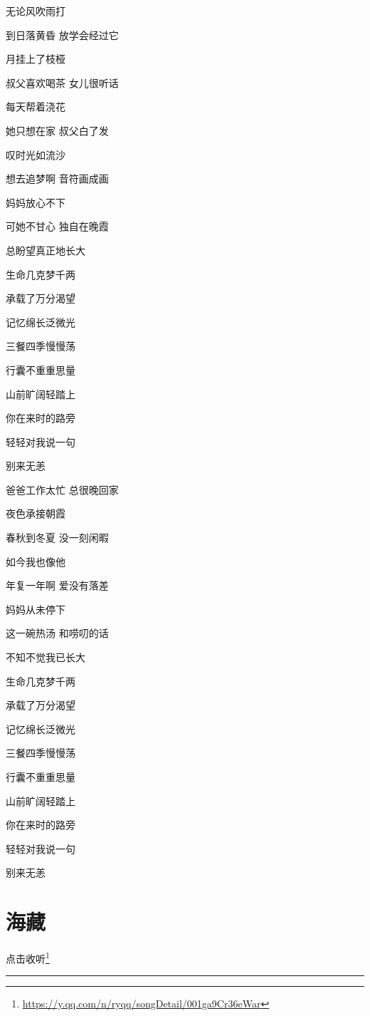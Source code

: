\documentclass[]{ctexbook}
\renewcommand{\href}[2]{#2\footnote{\url{#1}}}
\begin{document}
无论风吹雨打

到日落黄昏 放学会经过它

月挂上了枝桠

叔父喜欢喝茶 女儿很听话

每天帮着浇花

她只想在家 叔父白了发

叹时光如流沙

想去追梦啊 音符画成画

妈妈放心不下

可她不甘心 独自在晚霞

总盼望真正地长大

生命几克梦千两

承载了万分渴望

记忆绵长泛微光

三餐四季慢慢荡

行囊不重重思量

山前旷阔轻踏上

你在来时的路旁

轻轻对我说一句

别来无恙

爸爸工作太忙 总很晚回家

夜色承接朝霞

春秋到冬夏 没一刻闲暇

如今我也像他

年复一年啊 爱没有落差

妈妈从未停下

这一碗热汤 和唠叨的话

不知不觉我已长大

生命几克梦千两

承载了万分渴望

记忆绵长泛微光

三餐四季慢慢荡

行囊不重重思量

山前旷阔轻踏上

你在来时的路旁

轻轻对我说一句

别来无恙

\section*{海藏}\label{ocean-treasure}


\href{https://y.qq.com/n/ryqq/songDetail/001ga9Cr36eWar}{点击收听}

\begin{center}\rule{0.5\linewidth}{0.5pt}\end{center}
\end{document}
